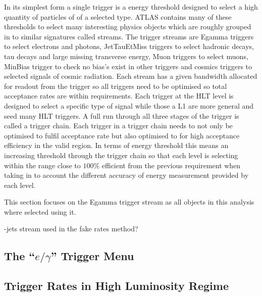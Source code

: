 In its simplest form a single trigger is a energy threshold designed to select a high quantity of particles of of a selected type. ATLAS contains many of these thresholds to select many interesting physics objects which are roughly grouped in to similar signatures called streams. The trigger streams are Egamma triggers to select electrons and photons, JetTauEtMiss triggers to select hadronic decays, tau decays and large missing transverse energy, Muon triggers to select muons, MinBias trigger to check no bias's exist in other triggers and cosmics triggers to selected signals of cosmic radiation. Each stream has a given bandwidth allocated for readout from the trigger so all triggers need to be optimised so total acceptance rates are within requirements. Each trigger at the HLT level is designed to select a specific type of signal while those a L1 are more general and seed many HLT triggers. A full run through all three stages of the trigger is called a trigger chain. Each trigger in a trigger chain needs to not only be optimised to fulfil acceptance rate but also optimised to for high acceptance efficiency in the valid region. In terms of energy threshold this means an increasing threshold through the trigger chain so that each level is selecting within the range close to $100\%$ efficient from the previous requirement when taking in to account the different accuracy of energy measurement provided by each level.

This section focuses on the Egamma trigger stream as all objects in this analysis where selected using it.

-jets stream used in the fake rates method?


\subsection{The ``$e/\gamma$'' Trigger Menu} 














\subsection{Trigger Rates in High Luminosity Regime}

